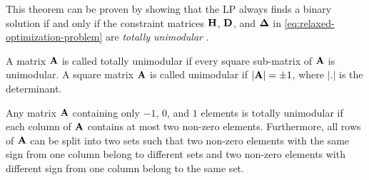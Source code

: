 \documentclass[journal, 10pt]{IEEEtran}
\begin{document}
This theorem can be proven by showing that the LP always finds a binary solution if and only if the constraint matrices ${{\mathbf{H}}}$, ${{\mathbf{D}}}$, and ${{\mathbf{\Delta}}}$ in \eqref{eq:relaxed-optimization-problem} are \emph{totally unimodular} \cite{Sierksma2001}.

%
%

\begin{Definition}
A matrix ${{\mathbf{A}}}$ is called totally unimodular if every square sub-matrix of ${{\mathbf{A}}}$ is unimodular. A square matrix ${{\mathbf{A}}}$ is called unimodular if $|{{\mathbf{A}}}| = \pm 1$, where $|.|$ is the determinant.
\end{Definition}


\begin{Corollary}
\label{cor:totally-unimodular}
Any matrix ${{\mathbf{A}}}$ containing only $-1$, $0$, and $1$ elements is totally unimodular if each column of ${{\mathbf{A}}}$ contains at most two non-zero elements. Furthermore, all rows of ${{\mathbf{A}}}$ can be split into two sets such that two non-zero elements with the same sign from one column belong to different sets and two non-zero elements with different sign from one column belong to the same set.
\end{Corollary}
\end{document}
